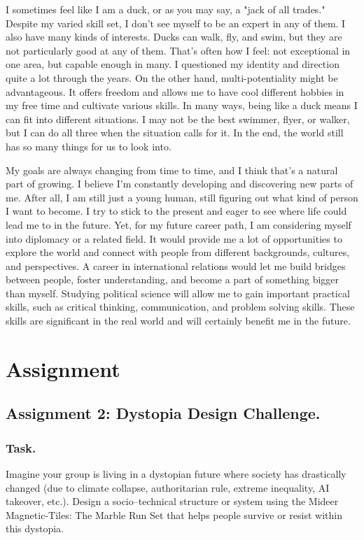 \documentclass[11pt]{book}
\begin{document}
I sometimes feel like I am a duck, or as you may say, a "jack of all trades." Despite my varied skill set, I don't see myself to be an expert in any of them. I also have many kinds of interests. Ducks can walk, fly, and swim, but they are not particularly good at any of them. That’s often how I feel: not exceptional in one area, but capable enough in many. I questioned my identity and direction quite a lot through the years. On the other hand, multi-potentiality might be advantageous. It offers freedom and allows me to have cool different hobbies in my free time and cultivate various skills. In many ways, being like a duck means I can fit into different situations. I may not be the best swimmer, flyer, or walker, but I can do all three when the situation calls for it. In the end, the world still has so many things for us to look into.

My goals are always changing from time to time, and I think that's a natural part of growing. I believe I'm constantly developing and discovering new parts of me. After all, I am still just a young human, still figuring out what kind of person I want to become. I try to stick to the present and eager to see where life could lead me to in the future. Yet, for my future career path, I am considering myself into diplomacy or a related field. It would provide me a lot of opportunities to explore the world and connect with people from different backgrounds, cultures, and perspectives. A career in international relations would let me build bridges between people, foster understanding, and become a part of something bigger than myself. Studying political science will allow me to gain important practical skills, such as critical thinking, communication, and problem solving skills. These skills are significant in the real world and will certainly benefit me in the future.

\part{Assignment}
	\chapter{Assignment 2: Dystopia Design Challenge.}
		\section{Task.}
			Imagine your group is living in a dystopian future where society has drastically changed (due to climate collapse, authoritarian rule, extreme inequality, AI takeover, etc.). Design a socio–technical structure or system using the Mideer Magnetic-Tiles: The Marble Run Set that helps people survive or resist within this dystopia.
			
\end{document}
